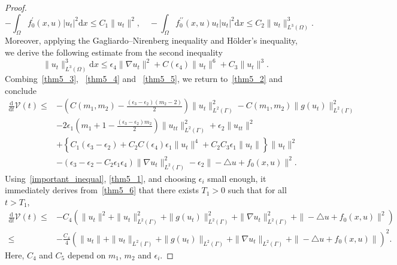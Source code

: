 \documentclass{elsarticle}
\begin{document}
\begin{proof}
\begin{equation}\label{thm5_4}
	-\int_{\Omega}f_0^{\prime}(x, u)|u_t|^2 \mathrm{d}x\leqslant C_1\|u_t\|^2,\quad -\int_{\Omega}f_0^{\prime\prime}(x, u)u_t|u_t|^2 \mathrm{d}x\leqslant C_2\|u_t\|^3_{L^3(\Omega)}.
\end{equation}
Moreover, applying the Gagliardo--Nirenberg inequality and H\"older's inequality, we derive the following estimate from the second inequality
\begin{equation}\label{thm5_5}
\|u_t\|^3_{L^3(\Omega)} \mathrm{d}x \leqslant \epsilon_{4}\|\nabla u_t\|^2 +C(\epsilon_{4}) \|u_t\|^6+C_3\|u_t\|^3.
\end{equation}
Combing~\eqref{thm5_3}, ~\eqref{thm5_4} and ~\eqref{thm5_5}, we return to~\eqref{thm5_2} and conclude
\begin{equation}\label{thm5_6}
\begin{split}
	\frac{\mathrm{d}}{\mathrm{d}t}\mathcal{V}(t) \leqslant & -\left(C(m_1, m_2)- \frac{(\epsilon_3-\epsilon_2)(m_2-2)}{2}\right)\|u_{t}\|^2_{L^2(\Gamma)} - C(m_1, m_2)\|g(u_{t})\|^2_{L^2(\Gamma)}\\
	&- 2\epsilon_1\left( m_1 + 1-\frac{(\epsilon_3-\epsilon_2)m_2}{2}\right)\|u_{tt}\|^2_{L^2(\Gamma)}+  \epsilon_2\|u_{tt}\|^2\\
	& + \left\{C_1(\epsilon_3-\epsilon_2)+ C_2  C(\epsilon_{4}) \epsilon_1\|u_t\|^4 + C_2  C_3 \epsilon_1\|u_t\|\right\}\|u_t\|^2\\
	&-  (\epsilon_3-\epsilon_2-C_2 \epsilon_{1}\epsilon_{4}) \|\nabla u_{t}\|^2_{L^2(\Gamma)} - \epsilon_2\|-\triangle u + f_0(x, u)\|^2 .
\end{split}
\end{equation}
Using~\eqref{important_inequal}, \eqref{thm5_1}, and choosing $\epsilon_{i}$ small enough, it immediately derives from~\eqref{thm5_6} that there exists $T_1>0$ such that for all $t>T_1$,
\begin{equation}\label{thm5_7}
\begin{split}
	\frac{\mathrm{d}}{\mathrm{d}t}\mathcal{V}(t) \leqslant& -C_4\left(\|u_{t}\|^2 + \|u_{t}\|^2_{L^2(\Gamma)} + \|g(u_{t})\|^2_{L^2(\Gamma)}+  \|\nabla u_{t}\|^2_{L^2(\Gamma)}+\|-\triangle u + f_0(x, u)\|^2\right)\\
	\leqslant& -\frac{C_4}{4}\left(\|u_{t}\| + \|u_{t}\|_{L^2(\Gamma)} +\|g(u_{t})\|_{L^2(\Gamma)}+  \|\nabla u_{t}\|_{L^2(\Gamma)}+\|-\triangle u + f_0(x, u)\|\right)^2.
\end{split}
\end{equation}
Here, $C_4$ and $C_5$ depend on $m_1$, $m_2$ and $\epsilon_{i}$.


\end{proof}
\end{document}
